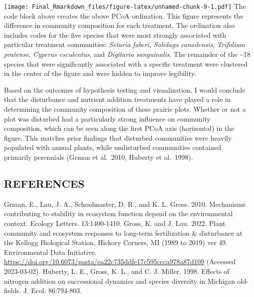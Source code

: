 \documentclass[
]{article}
\begin{document}
\texttt{[image: Final\_Rmarkdown\_files/figure-latex/unnamed-chunk-9-1.pdf]}
The code block above creates the above PCoA ordination. This figure
represents the difference in community composition for each treatment.
The ordination also includes codes for the five species that were most
strongly associated with particular treatment communities: \emph{Setaria
faberi}, \emph{Solidago canadensis}, \emph{Trifolium pratense},
\emph{Cyperus esculentus}, and \emph{Digitaria sanguinalis}. The
remainder of the \textasciitilde18 species that were significantly
associated with a specific treatment were clustered in the center of the
figure and were hidden to improve legibility.

Based on the outcomes of hypothesis testing and visualization, I would
conclude that the disturbance and nutrient addition treatments have
played a role in determining the community composition of these prairie
plots. Whether or not a plot was disturbed had a particularly strong
influence on community composition, which can be seen along the first
PCoA axis (horizontal) in the figure. This matches prior findings that
disturbed communities were heavily populated with annual plants, while
undisturbed communities contained primarily perennials (Grman et
al.~2010, Huberty et al.~1998).

\hypertarget{references}{%
\subsection{REFERENCES}\label{references}}

Grman, E., Lau, J. A., Schoolmaster, D. R., and K. L. Gross. 2010.
Mechanisms contributing to stability in ecosystem function depend on the
environmental context. Ecology Letters. 13:1400-1410. Gross, K. and J.
Lau. 2022. Plant community and ecosystem responses to long-term
fertilization \& disturbance at the Kellogg Biological Station, Hickory
Corners, MI (1989 to 2019) ver 49. Environmental Data Initiative.
\url{https://doi.org/10.6073/pasta/ea22c735ddfe17c595ccca978a87d109}
(Accessed 2023-03-02). Huberty, L. E., Gross, K. L., and C. J. Miller.
1998. Effects of nitrogen addition on successional dynamics and species
diversity in Michigan old-fields. J. Ecol. 86:794-803.
\end{document}
